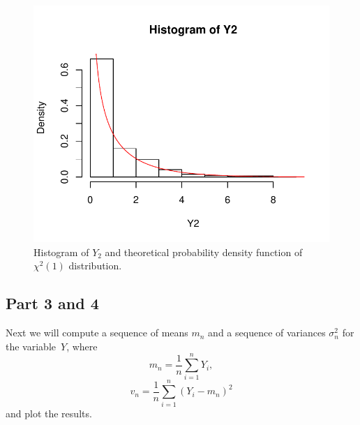 \documentclass[12pt, a4paper]{article}\usepackage[]{graphicx}\usepackage[]{color}
\makeatletter
\def\maxwidth{ %
  \ifdim\Gin@nat@width>\linewidth
    \linewidth
  \else
    \Gin@nat@width
  \fi
}
\newenvironment{knitrout}{}{} %
\makeatother
\begin{document}
\begin{knitrout}
\color{fgcolor}\begin{figure}[H]

{\centering \includegraphics[width=\maxwidth]{figure/ex1_2hist-1} 

}

\caption[Histogram of $Y_2$ and theoretical probability density function of $\chi^2(1)$ distribution]{Histogram of $Y_2$ and theoretical probability density function of $\chi^2(1)$ distribution.}\label{fig:ex1.2hist}
\end{figure}


\end{knitrout}

\subsection{Part 3 and 4}
Next we will compute a sequence of means $m_n$ and a sequence of variances $\sigma_n^2$ for the variable~$Y$, where
\[ m_n = \frac{1}{n} \sum_{i=1}^{n} Y_i, \]
\[ v_n = \frac{1}{n} \sum_{i=1}^{n} (Y_i - m_n)^2 \]
and plot the results.
\end{document}
